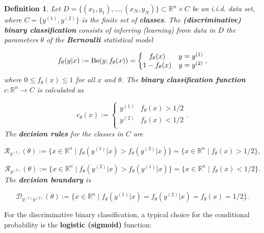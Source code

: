 \documentclass{report}
\newtheorem{definition}{Definition}[chapter]
\begin{document}
\begin{definition}
Let $D = \{(x_1,y_1),\dots,(x_N,y_N)\} \subset \mathbb{R}^n \times C$ be an i.i.d. data set, where $C = \{y^{(1)}, y^{(2)}\}$ is the finite set of \textbf{classes}. The \textbf{(discriminative) binary classification} consists of inferring (learning) from data in $D$ the parameters $\theta$ of the \textbf{Bernoulli} statistical model

\begin{equation}
f_\theta(y|x) := \textup{Be}(y;f_\theta(x)) = \left\{\begin{matrix}
f_\theta(x) & y=y^{(1)}\\
1 - f_\theta(x) & y = y^{(2)} \\
\end{matrix}\right.,
\end{equation}
where $0 \leq f_\theta(x) \leq 1$ for all $x$ and $\theta$. The \textbf{binary classification function} $c : \mathbb{R}^n \to C$ is calculated as

\begin{equation}
c_\theta(x) := \left\{\begin{matrix}
y^{(1)} & f_\theta(x) > 1/2\\
y^{(2)} & f_\theta(x) < 1/2\\
\end{matrix}\right..
\end{equation}
The \textbf{decision rules} for the classes in $C$ are

\begin{equation}
\mathcal{R}_{y^{(1)}}(\theta) := \{x \in \mathbb{R}^n \mid f_\theta(y^{(1)}|x) > f_\theta(y^{(2)}|x)\} = \{x \in \mathbb{R}^n \mid f_\theta(x) > 1/2\},
\end{equation}

\begin{equation}
\mathcal{R}_{y^{(2)}}(\theta) := \{x \in \mathbb{R}^n \mid f_\theta(y^{(2)}|x) > f_\theta(y^{(1)}|x)\} = \{x \in \mathbb{R}^n \mid f_\theta(x) < 1/2\}.
\end{equation}
The \textbf{decision boundary} is

\begin{equation}
\mathcal{D}_{y^{(1)}y^{(2)}}(\theta) := \{x \in \mathbb{R}^n \mid f_\theta(y^{(1)}|x) = f_\theta(y^{(2)}|x) = f_\theta(x) = 1/2\}.
\end{equation}
\end{definition}
For the discriminative binary classification, a typical choice for the conditional probability is the \textbf{logistic (sigmoid)} function:
\end{document}
